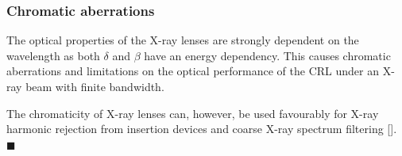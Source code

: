 \begin{refsection}
\subsubsection*{Chromatic aberrations}

The optical properties of the X-ray lenses are strongly dependent on the wavelength as both $\delta$ and $\beta$ have an energy dependency. This causes chromatic aberrations and limitations on the optical performance of the CRL under an X-ray beam with finite bandwidth. 

The chromaticity of X-ray lenses can, however, be used favourably for X-ray harmonic rejection from insertion devices and coarse X-ray spectrum filtering [\cite{Vaughan2011, Polikarpov2014}]. $\blacksquare$
\printbibliography[heading=subbibliography]
\end{refsection}


